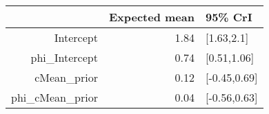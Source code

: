 \begin{tabular}{rrl}
  \hline
 & Expected mean & 95\% CrI \\ 
  \hline
Intercept & 1.84 & [1.63,2.1] \\ 
  phi\_Intercept & 0.74 & [0.51,1.06] \\ 
  cMean\_prior & 0.12 & [-0.45,0.69] \\ 
  phi\_cMean\_prior & 0.04 & [-0.56,0.63] \\ 
   \hline
\end{tabular}

